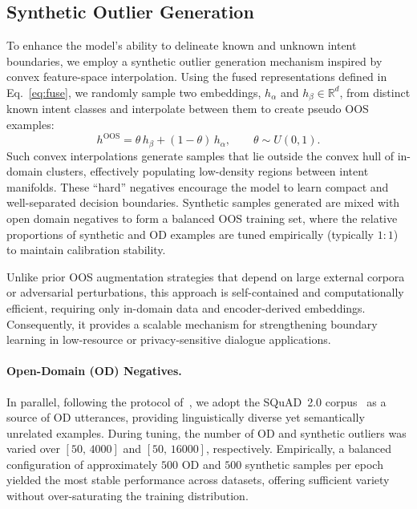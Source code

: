 \documentclass[journal,letterpaper]{IEEEtran}
\begin{document}
\subsection{Synthetic Outlier Generation}
\label{sec:synthetic_outliers}

To enhance the model’s ability to delineate known and unknown intent boundaries,
we employ a synthetic outlier generation mechanism inspired by convex feature-space interpolation.
Using the fused representations defined in Eq.~\eqref{eq:fuse}, we randomly sample
two embeddings, $h_\alpha$ and $h_\beta \in \mathbb{R}^{d}$, from distinct known intent classes and interpolate between them to create pseudo OOS examples:
\begin{equation}
\label{eq:synth}
h^{\text{OOS}} = \theta\, h_\beta + (1-\theta)\, h_\alpha, \qquad
\theta \sim U(0,1).
\end{equation}
Such convex interpolations generate samples that lie outside the convex hull of
in-domain clusters, effectively populating low-density regions between intent manifolds.
These “hard” negatives encourage the model to learn compact and well-separated decision
boundaries. Synthetic samples generated are mixed with open domain negatives to form a balanced OOS training set, where the relative proportions of synthetic and OD examples are tuned empirically (typically $1{:}1$) to maintain calibration stability.

Unlike prior OOS augmentation strategies that depend on large external corpora or
adversarial perturbations, this approach is self-contained and computationally efficient, requiring only in-domain data and encoder-derived embeddings. Consequently, it provides a scalable mechanism for strengthening boundary learning in low-resource or privacy-sensitive dialogue applications.

\paragraph*{Open-Domain (OD) Negatives.} In parallel, following the protocol of~\cite{Zhan_2021}, we adopt the SQuAD~2.0 corpus~\cite{Rajpurkar_2018}
as a source of OD utterances, providing linguistically diverse yet semantically unrelated examples.
During tuning, the number of OD and synthetic outliers was varied over $[50,\,4000]$ and $[50,\,16000]$,
respectively. Empirically, a balanced configuration of approximately $500$ OD and $500$ synthetic
samples per epoch yielded the most stable performance across datasets, offering sufficient variety
without over-saturating the training distribution.
\end{document}
